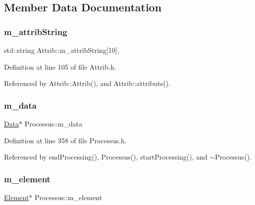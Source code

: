 \subsection{Member Data Documentation}
\mbox{\label{classAttrib_a3414521d7a82476e874b25a5407b5e63}} 
\subsubsection{\texorpdfstring{m\+\_\+attrib\+String}{m\_attribString}}
{\footnotesize\ttfamily std\+::string Attrib\+::m\+\_\+attrib\+String\mbox{[}10\mbox{]}\hspace{0.3cm}{\ttfamily [protected]}, {\ttfamily [inherited]}}



Definition at line 105 of file Attrib.\+h.



Referenced by Attrib\+::\+Attrib(), and Attrib\+::attributs().

\mbox{\label{classProcessus_a3da9a9de8af54e2f47807a3e09dfccff}} 
\subsubsection{\texorpdfstring{m\+\_\+data}{m\_data}}
{\footnotesize\ttfamily \hyperlink{classData}{Data}$\ast$ Processus\+::m\+\_\+data\hspace{0.3cm}{\ttfamily [private]}}



Definition at line 358 of file Processus.\+h.



Referenced by end\+Processing(), Processus(), start\+Processing(), and $\sim$\+Processus().

\mbox{\label{classProcessus_aa9d24d53c3e52f36786cabb5d8e296e7}} 
\subsubsection{\texorpdfstring{m\+\_\+element}{m\_element}}
{\footnotesize\ttfamily \hyperlink{classElement}{Element}$\ast$ Processus\+::m\+\_\+element\hspace{0.3cm}{\ttfamily [protected]}}



